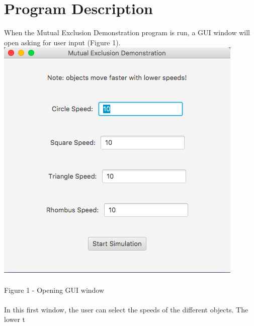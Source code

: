 \documentclass [11pt] {article}
\begin{document}
	\section {Program Description}
	When the Mutual Exclusion Demonstration program is run, a GUI window will open asking for user input (Figure 1).\\  \includegraphics [scale = 1] {Figure1}\\\\  Figure 1 - Opening GUI window\\\\  In this first window, the user can select the speeds of the different objects.  The lower t
\end{document}
